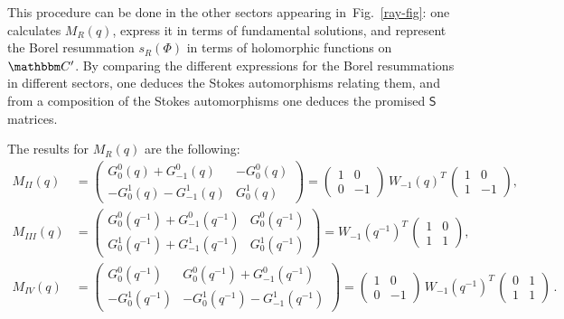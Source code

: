\documentclass[12pt,reqno]{amsart}
\theoremstyle{definition}
\def\BC{\mathbbm C}
\newcommand{\figref}[1]{Fig.~\protect\ref{#1}}
\begin{document}
This procedure can be done in the other sectors appearing
in~\figref{ray-fig}: one calculates $M_R(q)$, express it in terms of
fundamental solutions, and represent the Borel resummation $s_R(\Phi)$
in terms of holomorphic functions on $\BC'$. By comparing the
different expressions for the Borel resummations in different sectors,
one deduces the Stokes automorphisms relating them, and from a
composition of the Stokes automorphisms one deduces the promised
$\mathsf{S}$ matrices.
 
The results for $M_R(q)$ are the following:
%
\begin{equation}
\begin{aligned}
   M_{II}(q)&=\begin{pmatrix} G_0^0(q) + G_{-1}^0(q)& -G_0^0(q)  \\
     -G_0^1(q) - G_{-1}^1(q) & G_0^1 (q)    \end{pmatrix} =
\begin{pmatrix}
    1 & 0 \\
    0 & -1
  \end{pmatrix} \, W_{-1}(q)^T \,
        \begin{pmatrix}
          1 & 0 \\
          1 &-1
        \end{pmatrix}
   , \\
   M_{III}(q)&=\begin{pmatrix} G_0^0(q^{-1}) + G_{-1}^0(q^{-1})& G_0^0(q^{-1})
     \\ G_0^1(q^{-1}) +G_{-1}^1(q^{-1}) & G_0^1 (q^{-1})    \end{pmatrix}
   =
    W_{-1}(q^{-1})^T \,
    \begin{pmatrix}
      1 & 0 \\
      1 & 1 \end{pmatrix},\\
 M_{IV}(q)&=\begin{pmatrix} G_0^0(q^{-1}) &  G_0^0(q^{-1}) + G_{-1}^0(q^{-1}) 
   \\ -G_0^1 (q^{-1}) & -G_0^1(q^{-1}) -G_{-1}^1(q^{-1})      \end{pmatrix}
 =\begin{pmatrix}
    1 & 0 \\
    0 & -1
  \end{pmatrix} \,
        W_{-1}(q^{-1})^T \,
        \begin{pmatrix}
          0 & 1 \\
          1 & 1
        \end{pmatrix} \,. 
\end{aligned}
\end{equation}
\end{document}
